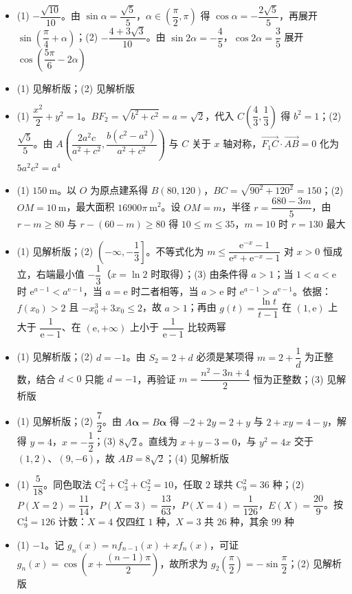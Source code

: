 \begin{itemize}[leftmargin=2.6em]
  \item[\textbf{15.}] (1) $-\dfrac{\sqrt{10}}{10}$。由 $\sin\alpha=\dfrac{\sqrt5}5$，$\alpha\in\left(\dfrac\pi2,\pi\right)$ 得 $\cos\alpha=-\dfrac{2\sqrt5}5$，再展开 $\sin\left(\dfrac\pi4+\alpha\right)$；(2) $-\dfrac{4+3\sqrt3}{10}$。由 $\sin2\alpha=-\dfrac45$，$\cos2\alpha=\dfrac35$ 展开 $\cos\left(\dfrac{5\pi}6-2\alpha\right)$
  \item[\textbf{16.}] (1) 见解析版；(2) 见解析版
  \item[\textbf{17.}] (1) $\dfrac{x^2}2+y^2=1$。$BF_2=\sqrt{b^2+c^2}=a=\sqrt2$，代入 $C\left(\dfrac43,\dfrac13\right)$ 得 $b^2=1$；(2) $\dfrac{\sqrt5}5$。由 $A\left(\dfrac{2a^2c}{a^2+c^2},\dfrac{b(c^2-a^2)}{a^2+c^2}\right)$ 与 $C$ 关于 $x$ 轴对称，$\overrightarrow{F_1C}\cdot\overrightarrow{AB}=0$ 化为 $5a^2c^2=a^4$
  \item[\textbf{18.}] (1) $150\ \mathrm m$。以 $O$ 为原点建系得 $B(80,120)$，$BC=\sqrt{90^2+120^2}=150$；(2) $OM=10\ \mathrm m$，最大面积 $16900\pi\ \mathrm{m^2}$。设 $OM=m$，半径 $r=\dfrac{680-3m}5$，由 $r-m\geqslant80$ 与 $r-(60-m)\geqslant80$ 得 $10\leqslant m\leqslant35$，$m=10$ 时 $r=130$ 最大
  \item[\textbf{19.}] (1) 见解析版；(2) $\left(-\infty,-\dfrac13\right]$。不等式化为 $m\leqslant\dfrac{\mathrm e^{-x}-1}{\mathrm e^x+\mathrm e^{-x}-1}$ 对 $x>0$ 恒成立，右端最小值 $-\dfrac13$（$x=\ln2$ 时取得）；(3) 由条件得 $a>1$；当 $1<a<\mathrm e$ 时 $\mathrm e^{a-1}<a^{\mathrm e-1}$，当 $a=\mathrm e$ 时二者相等，当 $a>\mathrm e$ 时 $\mathrm e^{a-1}>a^{\mathrm e-1}$。依据：$f(x_0)>2$ 且 $-x_0^3+3x_0\leqslant2$，故 $a>1$；再由 $g(t)=\dfrac{\ln t}{t-1}$ 在 $(1,\mathrm e)$ 上大于 $\dfrac1{\mathrm e-1}$、在 $(\mathrm e,+\infty)$ 上小于 $\dfrac1{\mathrm e-1}$ 比较两幂
  \item[\textbf{20.}] (1) 见解析版；(2) $d=-1$。由 $S_2=2+d$ 必须是某项得 $m=2+\dfrac1d$ 为正整数，结合 $d<0$ 只能 $d=-1$，再验证 $m=\dfrac{n^2-3n+4}2$ 恒为正整数；(3) 见解析版
\end{itemize}

\begin{itemize}[leftmargin=2.6em]
  \item[\textbf{21.}] (1) 见解析版；(2) $\dfrac72$。由 $A\boldsymbol\alpha=B\boldsymbol\alpha$ 得 $-2+2y=2+y$ 与 $2+xy=4-y$，解得 $y=4$，$x=-\dfrac12$；(3) $8\sqrt2$。直线为 $x+y-3=0$，与 $y^2=4x$ 交于 $(1,2)$、$(9,-6)$，故 $AB=8\sqrt2$；(4) 见解析版
  \item[\textbf{22.}] (1) $\dfrac5{18}$。同色取法 $\mathrm C_4^2+\mathrm C_3^2+\mathrm C_2^2=10$，任取 $2$ 球共 $\mathrm C_9^2=36$ 种；(2) $P(X=2)=\dfrac{11}{14}$，$P(X=3)=\dfrac{13}{63}$，$P(X=4)=\dfrac1{126}$，$E(X)=\dfrac{20}9$。按 $\mathrm C_9^4=126$ 计数：$X=4$ 仅四红 $1$ 种，$X=3$ 共 $26$ 种，其余 $99$ 种
  \item[\textbf{23.}] (1) $-1$。记 $g_n(x)=nf_{n-1}(x)+xf_n(x)$，可证 $g_n(x)=\cos\left(x+\dfrac{(n-1)\pi}2\right)$，故所求为 $g_2\left(\dfrac\pi2\right)=-\sin\dfrac\pi2$；(2) 见解析版
\end{itemize}
